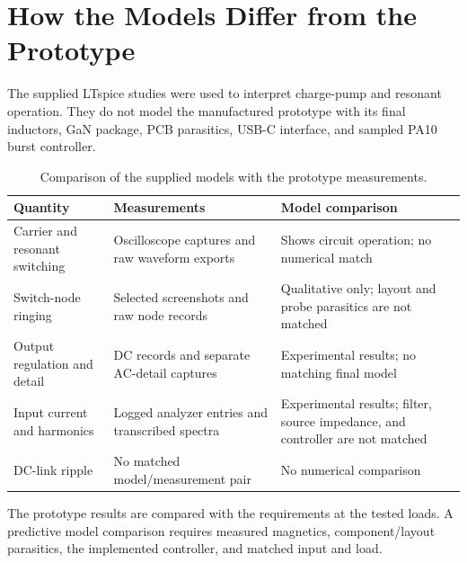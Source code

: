 \section{How the Models Differ from the Prototype}
\label{sec:res-simhw}

The supplied LTspice studies were used to interpret charge-pump and resonant
operation. They do not model the manufactured prototype with its final
inductors, GaN package, PCB parasitics, USB-C interface, and sampled PA10 burst
controller.

\begin{table}[htbp]
\centering
\caption{Comparison of the supplied models with the prototype measurements.}
\label{tab:simulation-hardware}
\begin{tabularx}{\textwidth}{@{}L{0.23\textwidth}L{0.34\textwidth}X@{}}
\toprule
Quantity & Measurements & Model comparison\\
\midrule
Carrier and resonant switching & Oscilloscope captures and raw waveform exports & Shows circuit operation; no numerical match\\
Switch-node ringing & Selected screenshots and raw node records & Qualitative only; layout and probe parasitics are not matched\\
Output regulation and detail & DC records and separate AC-detail captures & Experimental results; no matching final model\\
Input current and harmonics & Logged analyzer entries and transcribed spectra & Experimental results; filter, source impedance, and controller are not matched\\
DC-link ripple & No matched model/measurement pair & No numerical comparison\\
\bottomrule
\end{tabularx}
\end{table}

The prototype results are compared with the requirements at the tested loads.
A predictive model comparison requires measured magnetics, component/layout
parasitics, the implemented controller, and matched input and load.
